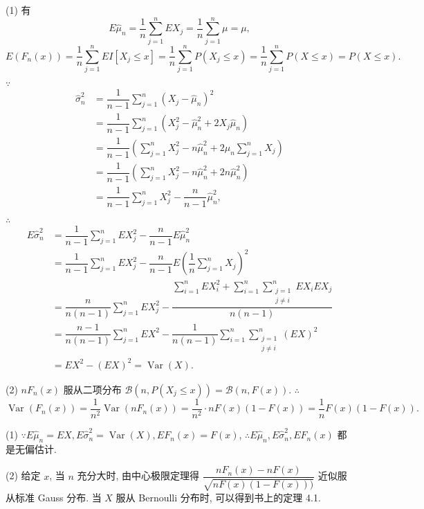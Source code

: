 \documentclass[color=black,device=normal,lang=cn]{elegantnote}
\numberwithin{equation}{section}
\theoremstyle{plain}
\numberwithin{exercise}{exsection}
\begin{document}
\begin{solution}
    (1) 有
    \[E\hat{\mu}_n=\dfrac{1}{n}\sum\limits_{j=1}^nEX_j=\dfrac{1}{n}\sum\limits_{j=1}^n\mu=\mu,\]
    \[E(F_n(x))=\dfrac{1}{n}\sum\limits_{j=1}^nEI[X_j\leq x]=\dfrac{1}{n}\sum\limits_{j=1}^nP(X_j\leq x)=\dfrac{1}{n}\sum\limits_{j=1}^nP(X\leq x)=P(X\leq x).\]

    $\because$
    \begin{align*}
        \hat{\sigma}_n^2 & =\dfrac{1}{n-1}\sum\limits_{j=1}^n(X_j-\hat{\mu}_n)^2 \\
        & =\dfrac{1}{n-1}\sum\limits_{j=1}^n(X_j^2-\hat{\mu}_n^2+2X_j\hat{\mu}_n) \\
        & =\dfrac{1}{n-1}\left(\sum\limits_{j=1}^nX_j^2-n\hat{\mu}_n^2+2\hat{\mu}_n\sum\limits_{j=1}^nX_j\right) \\
        & =\dfrac{1}{n-1}\left(\sum\limits_{j=1}^nX_j^2-n\hat{\mu}_n^2+2n\hat{\mu}_n^2\right) \\
        & =\dfrac{1}{n-1}\sum\limits_{j=1}^nX_j^2-\dfrac{n}{n-1}\hat{\mu}_n^2,
    \end{align*}

    $\therefore$
    \begin{align*}
        E\hat{\sigma}_n^2 & =\dfrac{1}{n-1}\sum\limits_{j=1}^nEX_j^2-\dfrac{n}{n-1}E\hat{\mu}_n^2 \\
        & =\dfrac{1}{n-1}\sum\limits_{j=1}^nEX_j^2-\dfrac{n}{n-1}E\left(\dfrac{1}{n}\sum\limits_{j=1}^nX_j\right)^2 \\
        & =\dfrac{n}{n(n-1)}\sum\limits_{j=1}^nEX_j^2-\dfrac{\sum\limits_{i=1}^nEX_i^2+\sum\limits_{i=1}^n\sum\limits_{\substack{j=1\\j\neq i}}^nEX_iEX_j}{n(n-1)} \\
        & =\dfrac{n-1}{n(n-1)}\sum\limits_{j=1}^nEX^2-\dfrac{1}{n(n-1)}\sum\limits_{i=1}^n\sum\limits_{\substack{j=1\\j\neq i}}^n(EX)^2 \\
        & =EX^2-(EX)^2=\operatorname{Var}(X).
    \end{align*}

    (2) $nF_n(x)$ 服从二项分布 $\mathcal{B}(n,P(X_j\leq x))=\mathcal{B}(n,F(x))$. $\therefore$
    \[\operatorname{Var}(F_n(x))=\dfrac{1}{n^2}\operatorname{Var}(nF_n(x))=\dfrac{1}{n^2}\cdot nF(x)(1-F(x))=\dfrac{1}{n}F(x)(1-F(x)).\]
\end{solution}
\begin{note}
    (1) $\because E\hat{\mu}_n=EX,E\hat{\sigma}_n^2=\operatorname{Var}(X),EF_n(x)=F(x)$, $\therefore E\hat{\mu}_n,E\hat{\sigma}_n^2,EF_n(x)$ 都是无偏估计.

    (2) 给定 $x$, 当 $n$ 充分大时, 由中心极限定理得 $\dfrac{nF_n(x)-nF(x)}{\sqrt{nF(x)(1-F(x)))}}$ 近似服从标准 Gauss 分布. 当 $X$ 服从 Bernoulli 分布时, 可以得到书上的定理 4.1.
\end{note}
\end{document}
